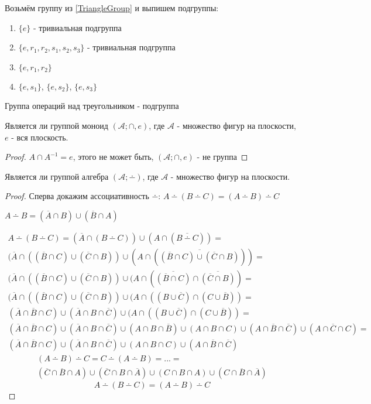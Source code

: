 \documentclass[../main/document.tex]{subfiles}
\begin{document}
\begin{exm}

Возьмём группу из \ref{TriangleGroup} и выпишем подгруппы:
\begin{enumerate}
\item $\{e\}$ - тривиальная подгруппа
\item $\{e,r_1,r_2,s_1,s_2,s_3\}$ - тривиальная подгруппа
\item $\{e,r_1,r_2\}$
\item $\{e,s_1\}$, $\{e,s_2\}$, $\{e,s_3\}$
\end{enumerate}
\end{exm}
\begin{exm}
Группа операций над треугольником - подгруппа
\end{exm}
\begin{exm}
Является ли группой моноид $(\mathcal{A};\cap,e)$, где $\mathcal{A}$ - множество фигур на плоскости, $e$ - вся плоскость.
\begin{proof}
$A\cap A^{-1}=e$, этого не может быть, $(\mathcal{A};\cap,e)$ - не группа
\end{proof}
Является ли группой алгебра $(\mathcal{A};\dotminus)$, где $\mathcal{A}$ - множество фигур на плоскости.
\begin{proof}
Сперва докажим ассоциативность $\dotminus$: $A\dotminus (B\dotminus C)=(A\dotminus B)\dotminus C$

$A\dotminus B=(\overline{A}\cap B)\cup(\overline{B}\cap A)$

\begin{multline*}
A\dotminus (B\dotminus C)=(\overline{A}\cap (B\dotminus C))\cup(A\cap (\overline{B\dotminus C}))=\\
(\overline{A}\cap ((\overline{B}\cap C)\cup(\overline{C}\cap B))\cup(A\cap (\overline{(\overline{B}\cap C)\cup(\overline{C}\cap B)}))=\\
(\overline{A}\cap ((\overline{B}\cap C)\cup(\overline{C}\cap B))\cup(A\cap
(\overline{(\overline{B}\cap C)}\cap \overline{(\overline{C}\cap B)})=\\
(\overline{A}\cap ((\overline{B}\cap C)\cup(\overline{C}\cap B))\cup(A\cap
((B\cup \overline{C})\cap (C\cup \overline{B}))=\\
(\overline{A}\cap \overline{B}\cap C)\cup (\overline{A}\cap B\cap \overline{C})
\cup(A\cap
((B\cup \overline{C})\cap (C\cup \overline{B}))=\\
(\overline{A}\cap \overline{B}\cap C)\cup (\overline{A}\cap B\cap \overline{C})
\cup
(A\cap B\cap \overline{B})\cup (A\cap B\cap C)\cup (A\cap \overline{B}\cap \overline{C})\cup (A\cap \overline{C}\cap C)=\\
(\overline{A}\cap \overline{B}\cap C)\cup (\overline{A}\cap B\cap \overline{C})
\cup
(A\cap B\cap C)\cup (A\cap \overline{B}\cap \overline{C})
\end{multline*}
\begin{multline*}
(A\dotminus B)\dotminus C=C\dotminus (A\dotminus B)=...=\\
(\overline{C}\cap \overline{B}\cap A)\cup (\overline{C}\cap B\cap \overline{A})
\cup
(C\cap B\cap A)\cup (C\cap \overline{B}\cap \overline{A})
\end{multline*}
$$A\dotminus (B\dotminus C)=(A\dotminus B)\dotminus C$$


\end{proof}
\end{exm}
\end{document}
